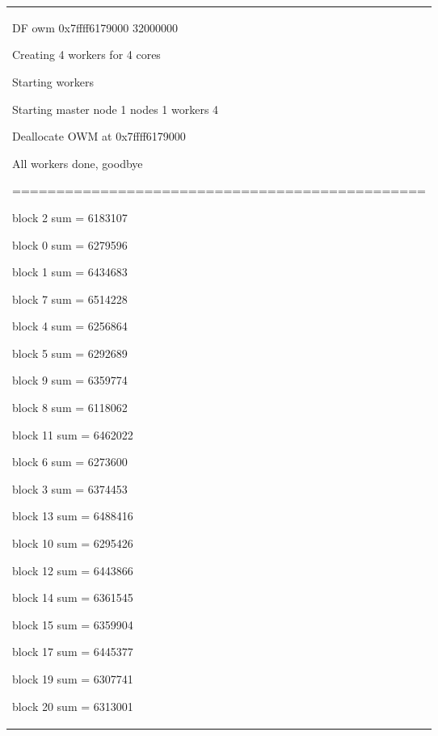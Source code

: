 \documentclass[a4paper]{article}
\begin{document}
\begin{flushleft}
\begin{tiny}
\begin{supertabular}{|m{6.34626in}|}
{\ttfamily DF owm 0x7ffff6179000
32000000}

{\ttfamily Creating 4 workers for 4
cores}

{\ttfamily Starting workers}

{\ttfamily Starting master node 1
nodes 1 workers 4}

{\ttfamily Deallocate OWM at
0x7ffff6179000}

{\ttfamily All workers done,
goodbye}

{\ttfamily
===============================================}

{\ttfamily block 2 sum = 6183107}

{\ttfamily block 0 sum = 6279596}

{\ttfamily block 1 sum = 6434683}

{\ttfamily block 7 sum = 6514228}

{\ttfamily block 4 sum = 6256864}

{\ttfamily block 5 sum = 6292689}

{\ttfamily block 9 sum = 6359774}

{\ttfamily block 8 sum = 6118062}

{\ttfamily block 11 sum = 6462022}

{\ttfamily block 6 sum = 6273600}

{\ttfamily block 3 sum = 6374453}

{\ttfamily block 13 sum = 6488416}

{\ttfamily block 10 sum = 6295426}

{\ttfamily block 12 sum = 6443866}

{\ttfamily block 14 sum = 6361545}

{\ttfamily block 15 sum = 6359904}

{\ttfamily block 17 sum = 6445377}

{\ttfamily block 19 sum = 6307741}

{\ttfamily block 20 sum = 6313001}


\end{supertabular}
\end{tiny}
\end{flushleft}
\end{document}
